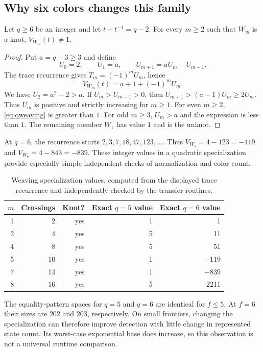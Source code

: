 \subsection{Why six colors changes this family}

\begin{theorem}
\label{thm:six}
Let $q\ge6$ be an integer and let $t+t^{-1}=q-2$.
For every $m\ge2$ such that $W_m$ is a knot,
$V_{W_m}(t)\ne1$.
\end{theorem}
\begin{proof}
Put $a=q-3\ge3$ and define
\[
 U_0=2,\qquad U_1=a,\qquad U_{m+1}=aU_m-U_{m-1}.
\]
The trace recurrence gives $T_m=(-1)^mU_m$, hence
\begin{equation}
 V_{W_m}(t)=a+1+(-1)^mU_m.
 \label{eq:qweaving}
\end{equation}
We have $U_2=a^2-2>a$. If $U_m>U_{m-1}>0$, then
$U_{m+1}>(a-1)U_m\ge2U_m$. Thus $U_m$ is positive and strictly
increasing for $m\ge1$.
For even $m\ge2$, \eqref{eq:qweaving} is greater than $1$.
For odd $m\ge3$, $U_m>a$ and the expression is less than $1$.
The remaining member $W_1$ has value $1$ and is the unknot.
\end{proof}

At $q=6$, the recurrence starts $2,3,7,18,47,123,\ldots$.
Thus $V_{W_5}=4-123=-119$ and $V_{W_7}=4-843=-839$.
These integer values in a quadratic specialization provide especially simple
independent checks of normalization and color count.

\begin{table}[htbp]
\centering
\begin{tabular}{@{}rrrrr@{}}
\toprule
$m$ & Crossings & Knot? & Exact $q=5$ value & Exact $q=6$ value\\
\midrule
1&2&yes&1&1\\
2&4&yes&5&11\\
4&8&yes&5&51\\
5&10&yes&1&$-119$\\
7&14&yes&1&$-839$\\
8&16&yes&5&2211\\
\bottomrule
\end{tabular}
\caption{Weaving specialization values, computed from the displayed trace
recurrence and independently checked by the transfer routines.}
\label{tab:weaving}
\end{table}

The equality-pattern spaces for $q=5$ and $q=6$ are identical for $f\le5$.
At $f=6$ their sizes are $202$ and $203$, respectively. On small frontiers,
changing the specialization can therefore improve detection with little
change in represented state count. Its worst-case exponential base does
increase, so this observation is not a universal runtime comparison.

